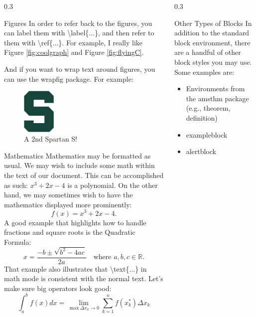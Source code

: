 \documentclass{msuposter}
\newcommand{\colwidth}{0.3\linewidth}
\begin{document}
\begin{frame}{}
\begin{columns}[t]
\begin{column}{\colwidth}
\begin{block}{Figures}
In order to refer back to the figures, you can label them with {\ttfamily\textbackslash label\{...\}}, and then refer to them with {\ttfamily\textbackslash ref\{...\}}.  For example, I really like Figure \ref{fig:coolgraph} and Figure \ref{fig:flyingC}.

And if you want to wrap text around figures, you can use the {\ttfamily wrapfig} package.  For example:

\begin{figure}
  \centering
    \includegraphics[width=0.25\textwidth]{spartans.jpg}
  \caption{A 2nd Spartan S!}
\end{figure}

\lipsum[1-2] %
\end{block}

\begin{block}{Mathematics}
Mathematics may be formatted as usual.  We may wish to include some math within the text of our document.  This can be accomplished as such: $x^{3} + 2x - 4$ is a polynomial.  On the other hand, we may sometimes wish to have the mathematics displayed more prominently:
\[
  f(x) = x^{3} + 2x - 4.
\]
A good example that highlights how to handle fractions and square roots is the Quadratic Formula:
\[
  x = \frac{-b \pm \sqrt{b^{2} - 4ac}}{2a} \quad\text{where } a,b,c \in \mathbb{R}.
\]
That example also illustrates that {\ttfamily \textbackslash text\{...\}} in math mode is consistent with the normal text.  Let's make sure big operators look good:
\[
  \int_{a}^{b} f(x) dx = \lim_{\max \Delta x_{k} \to 0} \sum_{k=1}^{n} f(x_{k}^{*}) \Delta x_{k}
\]
\end{block}

\end{column}


\begin{column}{\colwidth}

\begin{block}{Other Types of Blocks}
In addition to the standard {\ttfamily block} environment, there are a handful of other block styles you may use.  Some examples are:
\begin{itemize}
 \item Environments from the {\ttfamily amsthm} package (e.g., {\ttfamily theorem}, {\ttfamily definition})
 \item {\ttfamily exampleblock}
 \item {\ttfamily alertblock}
\end{itemize}
\end{block}


\end{column}
\end{columns}
\end{frame}
\end{document}
